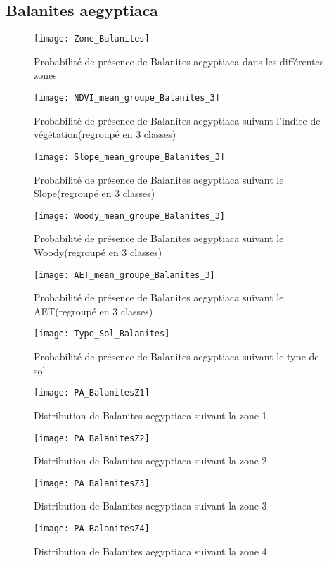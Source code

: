 \documentclass[a4paper, oneside, 12pt]{book}
\begin{document}
\subsection{Balanites aegyptiaca}

\begin{figure}[H]
	\centering
	\caption{Probabilité de présence de Balanites aegyptiaca dans les différentes zones}
	\texttt{[image: Zone\_Balanites]}	
\end{figure}


\begin{figure}[H]
	\centering
	\caption{Probabilité de présence de Balanites aegyptiaca suivant l'indice de végétation(regroupé en 3 classes)}
	\texttt{[image: NDVI\_mean\_groupe\_Balanites\_3]}
\end{figure}


\begin{figure}[H]
	\centering
	\caption{Probabilité de présence de Balanites aegyptiaca suivant le Slope(regroupé en 3 classes)}
	\texttt{[image: Slope\_mean\_groupe\_Balanites\_3]}
\end{figure}


\begin{figure}[H]
	\centering
	\caption{Probabilité de présence de Balanites aegyptiaca suivant le Woody(regroupé en 3 classes)}
	\texttt{[image: Woody\_mean\_groupe\_Balanites\_3]}
\end{figure}


\begin{figure}[H]
	\centering
	\caption{Probabilité de présence de Balanites aegyptiaca suivant le AET(regroupé en 3 classes)}
	\texttt{[image: AET\_mean\_groupe\_Balanites\_3]}
\end{figure}
\begin{figure}[H]
	\centering
	\caption{Probabilité de présence de Balanites aegyptiaca suivant le type de sol}
	\texttt{[image: Type\_Sol\_Balanites]}
\end{figure}
\begin{figure}[H]
	\centering
	\caption{Distribution de Balanites aegyptiaca suivant la zone 1}
	\texttt{[image: PA\_BalanitesZ1]}	
\end{figure}
\begin{figure}[H]
	\centering
	\caption{Distribution de Balanites aegyptiaca suivant la zone 2}
	\texttt{[image: PA\_BalanitesZ2]}	
\end{figure}
\begin{figure}[H]
	\centering
	\caption{Distribution de Balanites aegyptiaca suivant la zone 3}
	\texttt{[image: PA\_BalanitesZ3]}	
\end{figure}
\begin{figure}[H]
	\centering
	\caption{Distribution de Balanites aegyptiaca suivant la zone 4}
	\texttt{[image: PA\_BalanitesZ4]}	
\end{figure}
\end{document}
